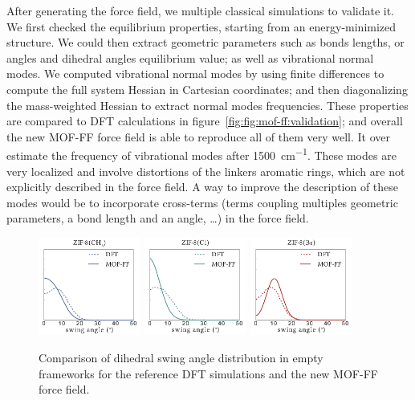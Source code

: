 \documentclass[thesis]{subfiles}
\begin{document}
After generating the force field, we multiple classical simulations to validate
it. We first checked the equilibrium properties, starting from an
energy-minimized structure. We could then extract geometric parameters such as
bonds lengths, or angles and dihedral angles equilibrium value; as well as
vibrational normal modes. We computed vibrational normal modes by using finite
differences to compute the full system Hessian in Cartesian coordinates; and
then diagonalizing the mass-weighted Hessian to extract normal modes
frequencies. These properties are compared to DFT calculations in
figure~\ref{fig:fig:mof-ff:validation}; and overall the new MOF-FF force field
is able to reproduce all of them very well. It over estimate the frequency of
vibrational modes after \SI{1500}{cm^{-1}}. These modes are very localized and
involve distortions of the linkers aromatic rings, which are not explicitly
described in the force field. A way to improve the description of these modes
would be to incorporate cross-terms (terms coupling multiples geometric
parameters, \ie a bond length and an angle, \dots) in the force field.

\begin{figure}[ht]
    \centering
    \includegraphics[width=0.3\textwidth]{figures/images/mof-ff/dihedrals-CH3}
    \includegraphics[width=0.3\textwidth]{figures/images/mof-ff/dihedrals-Cl}
    \includegraphics[width=0.3\textwidth]{figures/images/mof-ff/dihedrals-Br}
    \caption{Comparison of dihedral swing angle distribution in empty frameworks
    for the reference DFT simulations and the new MOF-FF force field.}
    \label{fig:fig:mof-ff:swing}
\end{figure}
\end{document}
